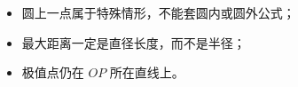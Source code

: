 \begin{trapbox}
\begin{itemize}
  \item 圆上一点属于特殊情形，不能套圆内或圆外公式；
  \item 最大距离一定是直径长度，而不是半径；
  \item 极值点仍在 $OP$ 所在直线上。
\end{itemize}
\end{trapbox}
